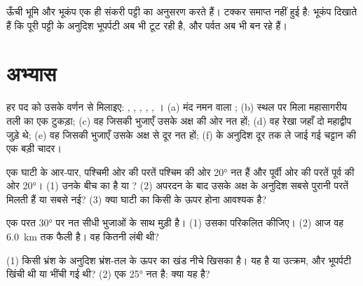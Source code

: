 ऊँची भूमि और भूकंप एक ही संकरी पट्टी का अनुसरण करते हैं।
टक्कर समाप्त नहीं हुई है: भूकंप दिखाते हैं कि पूरी पट्टी के अनुदिश भूपर्पटी अब भी टूट
रही है, और पर्वत अब भी बन रहे हैं।

\section{अभ्यास}

\begin{exercise}[$\star$]\label{exo:g12:mountain-building:1}
हर पद को उसके वर्णन से मिलाइए: , , , ,
, । (a) मंद नमन वाला ; (b) स्थल पर मिला
महासागरीय तली का एक टुकड़ा; (c) वह  जिसकी भुजाएँ उसके अक्ष की ओर नत हों;
(d) वह रेखा जहाँ दो महाद्वीप जुड़े थे; (e) वह  जिसकी भुजाएँ
उसके अक्ष से दूर नत हों; (f)  के अनुदिश दूर तक ले जाई गई चट्टान की एक बड़ी चादर।
\end{exercise}

\begin{exercise}[$\star$]\label{exo:g12:mountain-building:2}
एक घाटी के आर-पार, पश्चिमी ओर की परतें पश्चिम की ओर \ang{20} नत हैं और
पूर्वी ओर की परतें पूर्व की ओर \ang{20}। (1) उनके बीच का 
 है या ? (2) अपरदन के बाद उसके अक्ष के अनुदिश सबसे पुरानी परतें मिलती हैं या सबसे नई?
(3) क्या घाटी का किसी  के ऊपर होना आवश्यक है?
\end{exercise}

\begin{exercise}[$\star$]\label{exo:g12:mountain-building:3}
एक परत \ang{30} पर नत सीधी भुजाओं के साथ मुड़ी है। (1) उसका
 परिकलित कीजिए। (2) आज वह \qty{6.0}{km} तक फैली है। वह कितनी लंबी थी?
\end{exercise}

\begin{exercise}[$\star$]\label{exo:g12:mountain-building:4}
(1) किसी भ्रंश के अनुदिश भ्रंश-तल के ऊपर का खंड नीचे खिसका है। यह
 है या उत्क्रम, और भूपर्पटी खिंची थी या भींची गई थी?
(2) एक  \ang{25} नत है: क्या यह  है?
\end{exercise}

